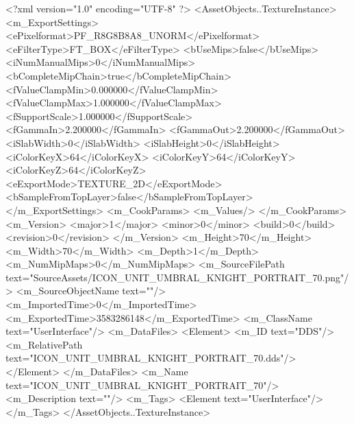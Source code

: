 <?xml version="1.0" encoding="UTF-8" ?>
<AssetObjects..TextureInstance>
	<m_ExportSettings>
		<ePixelformat>PF_R8G8B8A8_UNORM</ePixelformat>
		<eFilterType>FT_BOX</eFilterType>
		<bUseMips>false</bUseMips>
		<iNumManualMips>0</iNumManualMips>
		<bCompleteMipChain>true</bCompleteMipChain>
		<fValueClampMin>0.000000</fValueClampMin>
		<fValueClampMax>1.000000</fValueClampMax>
		<fSupportScale>1.000000</fSupportScale>
		<fGammaIn>2.200000</fGammaIn>
		<fGammaOut>2.200000</fGammaOut>
		<iSlabWidth>0</iSlabWidth>
		<iSlabHeight>0</iSlabHeight>
		<iColorKeyX>64</iColorKeyX>
		<iColorKeyY>64</iColorKeyY>
		<iColorKeyZ>64</iColorKeyZ>
		<eExportMode>TEXTURE_2D</eExportMode>
		<bSampleFromTopLayer>false</bSampleFromTopLayer>
	</m_ExportSettings>
	<m_CookParams>
		<m_Values/>
	</m_CookParams>
	<m_Version>
		<major>1</major>
		<minor>0</minor>
		<build>0</build>
		<revision>0</revision>
	</m_Version>
	<m_Height>70</m_Height>
	<m_Width>70</m_Width>
	<m_Depth>1</m_Depth>
	<m_NumMipMaps>0</m_NumMipMaps>
	<m_SourceFilePath text="SourceAssets/ICON_UNIT_UMBRAL_KNIGHT_PORTRAIT_70.png"/>
	<m_SourceObjectName text=""/>
	<m_ImportedTime>0</m_ImportedTime>
	<m_ExportedTime>3583286148</m_ExportedTime>
	<m_ClassName text="UserInterface"/>
	<m_DataFiles>
		<Element>
			<m_ID text="DDS"/>
			<m_RelativePath text="ICON_UNIT_UMBRAL_KNIGHT_PORTRAIT_70.dds"/>
		</Element>
	</m_DataFiles>
	<m_Name text="ICON_UNIT_UMBRAL_KNIGHT_PORTRAIT_70"/>
	<m_Description text=""/>
	<m_Tags>
		<Element text="UserInterface"/>
	</m_Tags>
</AssetObjects..TextureInstance>

